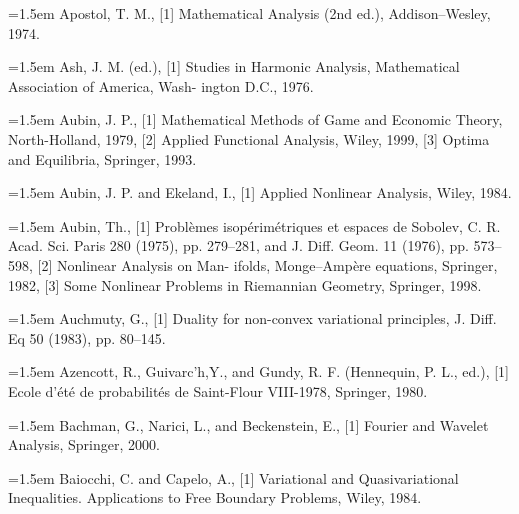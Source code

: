 \noindent\hangindent=1.5em Apostol, T. M., \hypertarget{ref:Apostol-1}{[1]} Mathematical Analysis (2nd ed.), Addison--Wesley, 1974.\par{}
\noindent\hangindent=1.5em Ash, J. M. (ed.), \hypertarget{ref:Ash-1}{[1]} Studies in Harmonic Analysis, Mathematical Association of America, Wash- ington D.C., 1976.\par{}
\noindent\hangindent=1.5em Aubin, J. P., \hypertarget{ref:Aubin-1}{[1]} Mathematical Methods of Game and Economic Theory, North-Holland, 1979, \hypertarget{ref:Aubin-2}{[2]} Applied Functional Analysis, Wiley, 1999, \hypertarget{ref:Aubin-3}{[3]} Optima and Equilibria, Springer, 1993.\par{}
\noindent\hangindent=1.5em Aubin, J. P. and Ekeland, I., \hypertarget{ref:AubinEkeland-1}{[1]} Applied Nonlinear Analysis, Wiley, 1984.\par{}
\noindent\hangindent=1.5em Aubin, Th., \hypertarget{ref:Aubin-1}{[1]} Problèmes isopérimétriques et espaces de Sobolev, C. R. Acad. Sci. Paris 280 (1975), pp. 279--281, and J. Diff. Geom. 11 (1976), pp. 573--598, \hypertarget{ref:Aubin-2}{[2]} Nonlinear Analysis on Man- ifolds, Monge--Ampère equations, Springer, 1982, \hypertarget{ref:Aubin-3}{[3]} Some Nonlinear Problems in Riemannian Geometry, Springer, 1998.\par{}
\noindent\hangindent=1.5em Auchmuty, G., \hypertarget{ref:Auchmuty-1}{[1]} Duality for non-convex variational principles, J. Diff. Eq 50 (1983), pp. 80--145.\par{}
\noindent\hangindent=1.5em Azencott, R., Guivarc'h,Y., and Gundy, R. F. (Hennequin, P. L., ed.), \hypertarget{ref:Azencott-1}{[1]} Ecole d'été de probabilités de Saint-Flour VIII-1978, Springer, 1980.\par{}
\noindent\hangindent=1.5em Bachman, G., Narici, L., and Beckenstein, E., \hypertarget{ref:BachmanNariciBeckenstein-1}{[1]} Fourier and Wavelet Analysis, Springer, 2000.\par{}
\noindent\hangindent=1.5em Baiocchi, C. and Capelo, A., \hypertarget{ref:BaiocchiCapelo-1}{[1]} Variational and Quasivariational Inequalities. Applications to Free Boundary Problems, Wiley, 1984.\par{}
